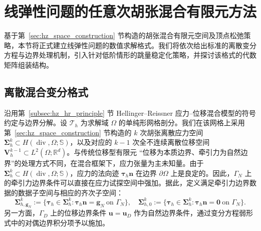 \section{线弹性问题的任意次胡张混合有限元方法}
\label{sec:hz_method_formulation}

基于第~\ref{sec:hz_space_construction} 节构造的胡张混合有限元空间及顶点松弛策略，本节将正式建立线弹性问题的数值求解格式。我们将依次给出标准的离散变分方程与边界处理机制，引入针对低阶情形的跳量稳定化策略，并探讨该格式的代数矩阵组装结构。


\subsection{离散混合变分格式}
\label{subsec:hz_discrete_form}

沿用第~\ref{subsec:hz_hr_principle} 节 Hellinger–Reissner 应力{--}位移混合模型的符号约定与边界分解。设 $\mathcal{T}_h$ 为求解域 $\Omega$ 的单纯形网格剖分。我们在该网格上采用第~\ref{sec:hz_space_construction} 节构造的 $k$ 次胡张离散应力空间 $\boldsymbol{\Sigma}_h^k\subset H(\operatorname{div},\Omega;\mathbb{S})$，以及对应的 $k-1$ 次全不连续离散位移空间 $\boldsymbol{V}_h^{k-1}\subset L^2(\Omega;\mathbb{R}^d)$。与传统位移型有限元 “位移为本质边界、牵引力为自然边界”的处理方式不同，在混合框架下，应力张量为主未知量。由于 $\boldsymbol{\Sigma}_h^k\subset H(\operatorname{div},\Omega;\mathbb{S})$，应力的法向迹 $\boldsymbol{\tau}_h\boldsymbol{n}$ 在边界 $\partial\Omega$ 上是良定的。因此，$\Gamma_N$ 上的牵引力边界条件可以直接在应力试探空间中强加。据此，定义满足牵引力边界数据的数据子空间与相应的齐次子空间：
\[
\boldsymbol{\Sigma}_{h,\boldsymbol{g}_N}^k := \{\boldsymbol{\tau}_h\in\boldsymbol{\Sigma}_h^k:\boldsymbol{\tau}_h\boldsymbol{n}=\boldsymbol{g}_N\ \text{on }\Gamma_N\},\quad \boldsymbol{\Sigma}_{h,0}^k := \{\boldsymbol{\tau}_h\in\boldsymbol{\Sigma}_h^k:\boldsymbol{\tau}_h\boldsymbol{n}=\boldsymbol{0}\ \text{on }\Gamma_N\}.
\]
另一方面，$\Gamma_D$ 上的位移边界条件 $\boldsymbol{u}=\boldsymbol{u}_D$ 作为自然边界条件，通过变分方程弱形式中的对偶边界积分项予以施加。

